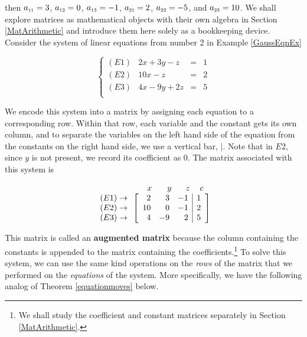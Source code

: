 then $a_{\mbox{\tiny$11$}} = 3$, $a_{\mbox{\tiny$12$}} = 0$, $a_{\mbox{\tiny$13$}} = -1$, $a_{\mbox{\tiny$21$}} = 2$, $a_{\mbox{\tiny$22$}} = -5$, and $a_{\mbox{\tiny$23$}} = 10$.  We shall explore matrices as mathematical objects with their own algebra in Section \ref{MatArithmetic} and introduce them here solely as a bookkeeping device.  Consider the system of linear equations  from number 2 in Example \ref{GaussEqnEx}

\[\left\{ \begin{array}{lrcr} (E1) & 2x+3y-z & = & 1 \\ 
(E2) & 10x-z & = & 2 \\ 
(E3) & 4x-9y+2z & = & 5 \\ \end{array} \right.\]  

We encode this system into a matrix by assigning each equation to a corresponding row.  Within that row, each variable and the constant gets its own column, and to separate the variables on the left hand side of the equation from the constants on the right hand side, we use a vertical bar, $|$.  Note that in $E2$, since $y$ is not present, we record its coefficient as $0$. The matrix associated with this system is 

\[ \begin{array}{c} \begin{array}{rrrrrrr} & & & \hspace{.33in} x & \hspace{.12in} y & \hspace{.1in} z & \hspace{.03in} c \\ \end{array} \\  \begin{array}{r} (E1) \rightarrow \\ (E2) \rightarrow \\ (E3) \rightarrow \end{array}  \left[ \begin{array}{rrr|r} 2 & 3 & -1 & 1\\ 10 & 0 & -1 & 2 \\ 4 & -9 & 2 & 5 \end{array} \right] \end{array} \]  

This matrix is called an   \textbf{augmented matrix} because the column containing the constants is appended to the matrix containing the coefficients.\footnote{We shall study the coefficient and constant matrices separately in Section \ref{MatArithmetic}.}  To solve this system, we can use the same kind operations on the \textit{rows} of the matrix that we performed on the \textit{equations} of the system. More specifically, we have the following analog of Theorem \ref{equationmoves} below.

